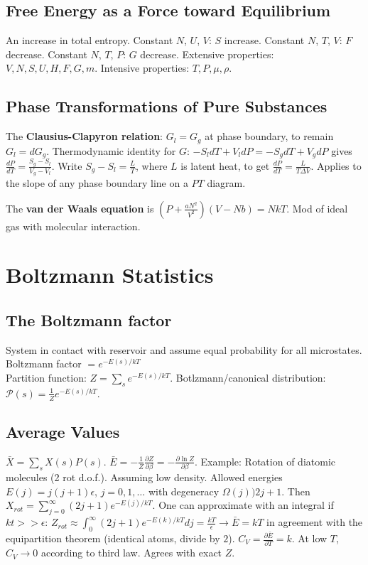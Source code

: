\documentclass[11pt,twocolumn]{amsart}
\begin{document}
\subsection{Free Energy as a Force toward Equilibrium}
An increase in total entropy. Constant $N$, $U$, $V$: $S$ increase. Constant $N$, $T$, $V$: $F$ decrease. Constant $N$, $T$, $P$: $G$ decrease. Extensive properties: $V,N,S,U,H,F,G,m$. Intensive properties: $T,P,\mu, \rho$.

\subsection{Phase Transformations of Pure Substances}
The \textbf{Clausius-Clapyron relation}: $G_l = G_g$ at phase boundary, to remain $G_l = dG_g$. Thermodynamic identity for $G$:  $-S_ldT + V_ldP = -S_gdT + V_gdP$ gives $\frac{dP}{dT} = \frac{S_g-S_l}{V_g-V_l}$. Write $S_g-S_l = \frac{L}{T}$, where $L$ is latent heat, to get $\frac{dP}{dT} = \frac{L}{T\Delta V}$. Applies to the slope of any phase boundary line on a $PT$ diagram.

The \textbf{van der Waals equation} is $\left(P + \frac{aN^2}{V^2}\right)(V-Nb) = NkT$. Mod of ideal gas with molecular interaction.

\section{Boltzmann Statistics}

\subsection{The Boltzmann factor}
System in contact with reservoir and assume equal probability for all microstates. Boltzmann factor $=e^{-E(s)/kT}$\\ Partition function:  $Z = \sum_s e^{-E(s)/kT}$. Botlzmann/canonical distribution:  $\mathcal{P}(s) = \frac{1}{Z}e^{-E(s)/kT}$.

\subsection{Average Values}
$\bar{X} = \sum_s X(s) P(s)$. $\bar{E} = -\frac{1}{Z} \frac{\partial Z}{\partial \beta} = -\frac{\partial \ln Z}{\partial \beta}$. Example: Rotation of diatomic molecules (2 rot d.o.f.). Assuming low density. Allowed energies $E(j) = j(j +1)\epsilon$, $j=0,1,\dots$ with degeneracy $\Omega(j) ) 2j + 1$. Then $X_{rot} = \sum_{j=0}^\infty (2j+1) e^{-E(j)/kT}$. One can approximate with an integral if $kt >> \epsilon$: $Z_{rot} \approx \int_0^\infty (2j+1) e^{-E(k)/kT}dj = \frac{kT}{\epsilon} \rightarrow \bar{E} = kT$ in agreement with the equipartition theorem (identical atoms, divide by $2$). $C_V = \frac{\partial \bar{E}}{\partial T} = k$. At low $T$, $C_V \rightarrow 0$ according to third law. Agrees with exact $Z$. 
\end{document}
